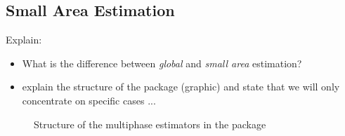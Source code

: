\documentclass[article]{jss}
\begin{document}
% 



\subsection{Small Area Estimation}

Explain:
\begin{itemize}
  \item What is the difference between \textit{global} and \textit{small area} estimation?
  \item explain the structure of the package (graphic) and state that we will only concentrate on specific cases ...
\end{itemize}


\begin{figure}[htb]
\centering
{}
\caption{Structure of the multiphase estimators in the  package }
\label{fig:struct_package}
\end{figure}




%



\end{document}
